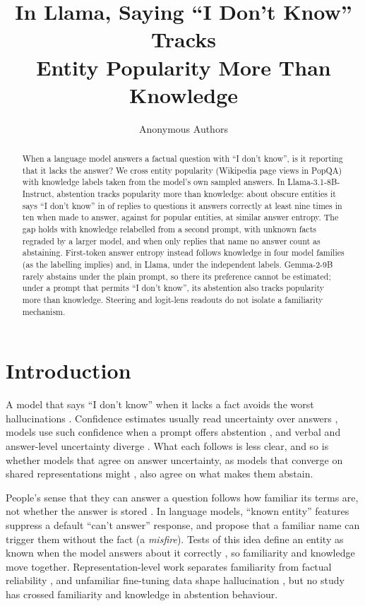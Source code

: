 \documentclass{article}
\title{In Llama, Saying ``I Don't Know'' Tracks\\Entity Popularity More Than Knowledge}
\author{Anonymous Authors}
\newcommand{\idk}{``I don't know''}
\begin{document}
\maketitle

\begin{abstract}
When a language model answers a factual question with \idk, is it reporting that it lacks the answer? We cross entity popularity (Wikipedia page views in PopQA) with knowledge labels taken from the model's own sampled answers. In Llama-3.1-8B-Instruct, abstention tracks popularity more than knowledge: about obscure entities it says \idk{} in \hmLlamaObsKnown{} of replies to questions it answers correctly at least nine times in ten when made to answer, against \hmLlamaPopKnown{} for popular entities, at similar answer entropy. The gap holds with knowledge relabelled from a second prompt, with unknown facts regraded by a larger model, and when only replies that name no answer count as abstaining. First-token answer entropy instead follows knowledge in four model families (as the labelling implies) and, in Llama, under the independent labels. Gemma-2-9B rarely abstains under the plain prompt, so there its preference cannot be estimated; under a prompt that permits \idk, its abstention also tracks popularity more than knowledge. Steering and logit-lens readouts do not isolate a familiarity mechanism.
\end{abstract}

\section{Introduction}

A model that says \idk{} when it lacks a fact avoids the worst hallucinations \citep{kalai2025hallucinate}. Confidence estimates usually read uncertainty over answers \citep{kadavath2022know,kuhn2023semantic,stolfo2024confidence}, models use such confidence when a prompt offers abstention \citep{kumaran2026confidence}, and verbal and answer-level uncertainty diverge \citep{ji2025hedging}. What each follows is less clear, and so is whether models that agree on answer uncertainty, as models that converge on shared representations might \citep{huh2024platonic}, also agree on what makes them abstain.

People's sense that they can answer a question follows how familiar its terms are, not whether the answer is stored \citep{reder1992,schwartz1992}. In language models, ``known entity'' features suppress a default ``can't answer'' response, and \citet{lindsey2025biology} propose that a familiar name can trigger them without the fact (a \emph{misfire}). Tests of this idea define an entity as known when the model answers about it correctly \citep{ferrando2025iknow}, so familiarity and knowledge move together. Representation-level work separates familiarity from factual reliability \citep{brzezinka2026bielik}, and unfamiliar fine-tuning data shape hallucination \citep{kang2025unfamiliar}, but no study has crossed familiarity and knowledge in abstention behaviour.
\end{document}
